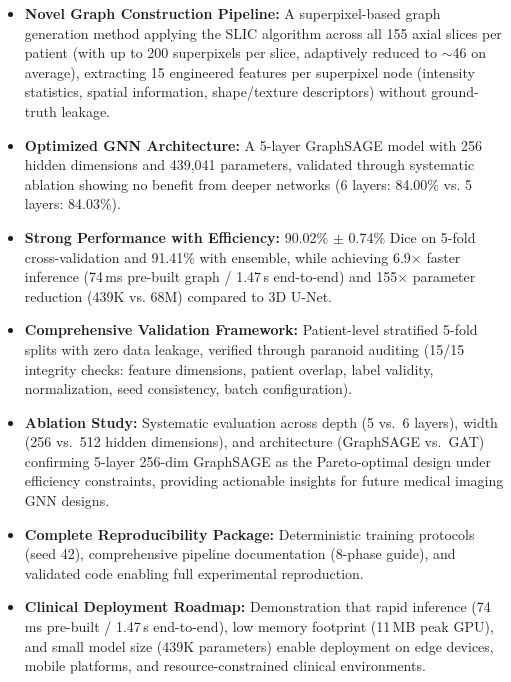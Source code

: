 \begin{itemize}

    \item \textbf{Novel Graph Construction Pipeline:} A superpixel-based graph generation method applying the SLIC algorithm across all 155 axial slices per patient (with up to 200 superpixels per slice, adaptively reduced to $\sim$46 on average), extracting 15 engineered features per superpixel node (intensity statistics, spatial information, shape/texture descriptors) without ground-truth leakage.
    
    \item \textbf{Optimized GNN Architecture:} A 5-layer GraphSAGE model with 256 hidden dimensions and 439,041 parameters, validated through systematic ablation showing no benefit from deeper networks (6 layers: 84.00\% vs. 5 layers: 84.03\%).
    
    \item \textbf{Strong Performance with Efficiency:} 90.02\% $\pm$ 0.74\% Dice on 5-fold cross-validation and 91.41\% with ensemble, while achieving 6.9$\times$ faster inference (74\,ms pre-built graph / 1.47\,s end-to-end) and 155$\times$ parameter reduction (439K vs. 68M) compared to 3D U-Net.
    
    \item \textbf{Comprehensive Validation Framework:} Patient-level stratified 5-fold splits with zero data leakage, verified through paranoid auditing (15/15 integrity checks: feature dimensions, patient overlap, label validity, normalization, seed consistency, batch configuration).
    
    \item \textbf{Ablation Study:} Systematic evaluation across depth (5 vs.\ 6 layers), width (256 vs.\ 512 hidden dimensions), and architecture (GraphSAGE vs.\ GAT) confirming 5-layer 256-dim GraphSAGE as the Pareto-optimal design under efficiency constraints, providing actionable insights for future medical imaging GNN designs.

    \item \textbf{Complete Reproducibility Package:} Deterministic training protocols (seed 42), comprehensive pipeline documentation (8-phase guide), and validated code enabling full experimental reproduction.
    
    \item \textbf{Clinical Deployment Roadmap:} Demonstration that rapid inference (74\,ms pre-built / 1.47\,s end-to-end), low memory footprint (11\,MB peak GPU), and small model size (439K parameters) enable deployment on edge devices, mobile platforms, and resource-constrained clinical environments.
\end{itemize}


